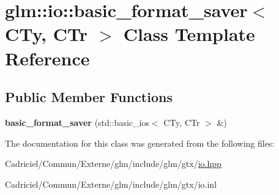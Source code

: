 \hypertarget{classglm_1_1io_1_1basic__format__saver}{}\section{glm\+:\+:io\+:\+:basic\+\_\+format\+\_\+saver$<$ C\+Ty, C\+Tr $>$ Class Template Reference}
\label{classglm_1_1io_1_1basic__format__saver}
\subsection*{Public Member Functions}
\begin{DoxyCompactItemize}
\item 
{\bfseries basic\+\_\+format\+\_\+saver} (std\+::basic\+\_\+ios$<$ C\+Ty, C\+Tr $>$ \&)\hypertarget{classglm_1_1io_1_1basic__format__saver_a9688fa6dce0c32285527df2336ca9127}{}\label{classglm_1_1io_1_1basic__format__saver_a9688fa6dce0c32285527df2336ca9127}

\end{DoxyCompactItemize}


The documentation for this class was generated from the following files\+:\begin{DoxyCompactItemize}
\item 
Cadriciel/\+Commun/\+Externe/glm/include/glm/gtx/\hyperlink{io_8hpp}{io.\+hpp}\item 
Cadriciel/\+Commun/\+Externe/glm/include/glm/gtx/io.\+inl\end{DoxyCompactItemize}
